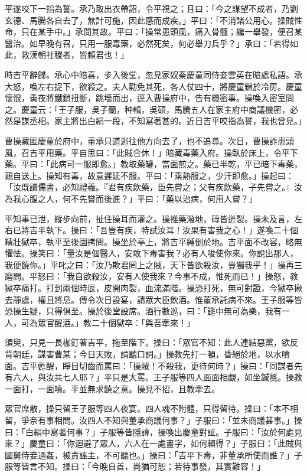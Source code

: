 平遂咬下一指為誓。承乃取出衣帶詔，令平視之；且曰：「今之謀望不成者，乃劉玄德、馬騰各自去了，無計可施，因此感而成疾。」平曰：「不消諸公用心。操賊性命，只在某手中。」承問其故。平曰：「操常患頭風，痛入骨髓；纔一舉發，便召某醫治。如早晚有召，只用一服毒藥，必然死矣，何必舉刀兵乎？」承曰：「若得如此，救漢朝社稷者，皆賴君也！」

時吉平辭歸。承心中暗喜，步入後堂，忽見家奴秦慶童同侍妾雲英在暗處私語。承大怒，喚左右捉下，欲殺之。夫人勸免其死，各人仗四十，將慶童鎖於冷房。慶童懷恨，夤夜將鐵鎖扭斷，跳墻而出，逕入曹操府中，告有機密事。操喚入密室問之。慶童云：「王子服，吳子蘭，种輯，吳碩，馬騰五人在家主府中商議機密，必然是謀丞相。家主將出白絹一段，不知寫著甚的。近日吉平咬指為誓，我也曾見。」

曹操藏匿慶童於府中，董承只道逃往他方向去了，也不追尋。次日，曹操詐患頭風，召吉平用藥。平自思曰：「此賊合休！」暗藏毒藥入府。操臥於床上，令平下藥。平曰：「此病可一服即愈。」教取藥罐，當面煎之。藥已半乾，平已暗下毒藥，親自送上。操知有毒，故意遲延不服。平曰：「乘熱服之，少汗即愈。」操起曰：「汝既讀儒書，必知禮義。『君有疾飲藥，臣先嘗之；父有疾飲藥，子先嘗之。』汝為我心腹之人，何不先嘗而後進？」平曰：「藥以治病，何用人嘗？」

平知事已泄，縱步向前，扯住操耳而灌之。操推藥潑地，磚皆迸裂。操未及言，左右已將吉平執下。操曰：「吾豈有疾，特試汝耳！汝果有害我之心！」遂喚二十個精壯獄卒，執平至後園拷問。操坐於亭上，將吉平縛倒於地。吉平面不改容，略無懼怯。操笑曰：「量汝是個醫人，安敢下毒害我？必有人唆使你來。你說出那人，我便饒你。」平叱之曰：「汝乃欺君罔上之賊，天下皆欲殺汝，豈獨我乎！」操再三磨問。平怒曰：「我自欲殺汝，安有人使我來？今事不成，惟死而已！」操怒，教獄卒痛打。打到兩個時辰，皮開肉裂，血流滿階。操恐打死，無可對證，今獄卒揪去靜處，權且將息。傳令次日設宴，請眾大臣飲酒。惟董承託病不來。王子服等皆恐操生疑，只得俱至。操於後堂設席。酒行數巡，曰：「筵中無可為樂，我有一人，可為眾官醒酒。」教二十個獄卒：「與吾牽來！」

須臾，只見一長枷釘著吉平，拖至階下。操曰：「眾官不知：此人連結惡黨，欲反背朝廷，謀害曹某；今日天敗，請聽口詞。」操教先打一頓，昏絕於地，以水噴面。吉平甦醒，睜目切齒而罵曰：「操賊！不殺我，更待何時？」操曰：「同謀者先有六人，與汝共七人耶？」平只是大罵。王子服等四人面面相覷，如坐鍼氈。操教一面打，一面噴。平並無求饒之意。操見不招，且教牽去。

眾官席散，操只留王子服等四人夜宴。四人魂不附體，只得留待。操曰：「本不相留，爭奈有事相問。汝四人不知與董承商議何事？」子服曰：「並未商議甚事。」操曰：「白絹中寫著何事？」子服等皆隱諱，操喚出慶童對証。子服曰：「汝於何處見來？」慶童曰：「你迴避了眾人，六人在一處畫字，如何賴得？」子服曰：「此賊與國舅侍妾通姦，被責誣主，不可聽也。」操曰：「吉平下毒，非董承所使而誰？」子服等皆言不知。操曰：「今晚自首，尚猶可恕；若待事發，其實難容！」

